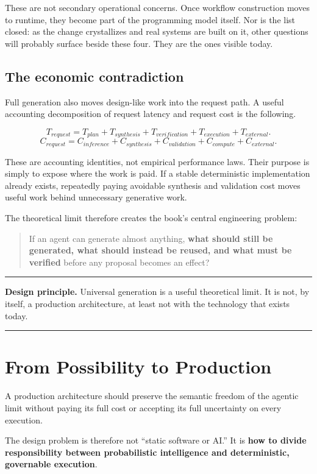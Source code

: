 \documentclass[10pt,oneside,openany]{book}
\newcommand{\principle}[1]{%
  \vspace{4pt}
  \noindent\begin{minipage}{\linewidth}
  \hrule\vspace{5pt}
  \small\sffamily\raggedright\textbf{Design principle.} #1
  \vspace{5pt}\hrule
  \end{minipage}\vspace{4pt}
}
\begin{document}
These are not secondary operational concerns. Once workflow construction moves to runtime, they become part of the programming model itself. Nor is the list closed: as the change crystallizes and real systems are built on it, other questions will probably surface beside these four. They are the ones visible today.

\section{The economic contradiction}

Full generation also moves design-like work into the request path. A useful accounting decomposition of request latency and request cost is the following.
\begin{formulabox}
\[
T_{request}
=
T_{plan}+T_{synthesis}+T_{verification}+T_{execution}+T_{external}.
\]
\[
C_{request}
=
C_{inference}+C_{synthesis}+C_{validation}+C_{compute}+C_{external}.
\]
\end{formulabox}
These are accounting identities, not empirical performance laws. Their purpose is simply to expose where the work is paid. If a stable deterministic implementation already exists, repeatedly paying avoidable synthesis and validation cost moves useful work behind unnecessary generative work.

The theoretical limit therefore creates the book's central engineering problem:

\begin{quote}
If an agent can generate almost anything, \textbf{what should still be generated, what should instead be reused, and what must be verified} before any proposal becomes an effect?
\end{quote}

\principle{Universal generation is a useful theoretical limit. It is not, by itself, a production architecture, at least not with the technology that exists today.}

\chapter{From Possibility to Production}

A production architecture should preserve the semantic freedom of the agentic limit without paying its full cost or accepting its full uncertainty on every execution.

The design problem is therefore not ``static software or AI.'' It is \textbf{how to divide responsibility between probabilistic intelligence and deterministic, governable execution}.
\end{document}

